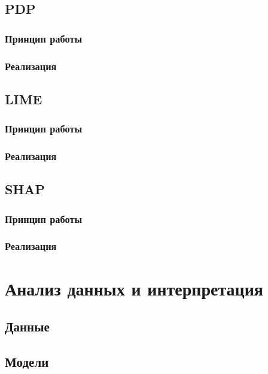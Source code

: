 \documentclass[a4paper, 12pt]{article}
\begin{document}
	\subsection{PDP}
	
	\subsubsection{Принцип работы}
	
	\subsubsection{Реализация}
	
	\subsection{LIME}
	
	\subsubsection{Принцип работы}
	
	\subsubsection{Реализация}
	
	\subsection{SHAP}
	
	\subsubsection{Принцип работы}
	
	\subsubsection{Реализация}
	
	\newpage

	\section{Анализ данных и интерпретация}
	
	\subsection{Данные}
	
	\subsection{Модели}
	
	\newpage
\end{document}
